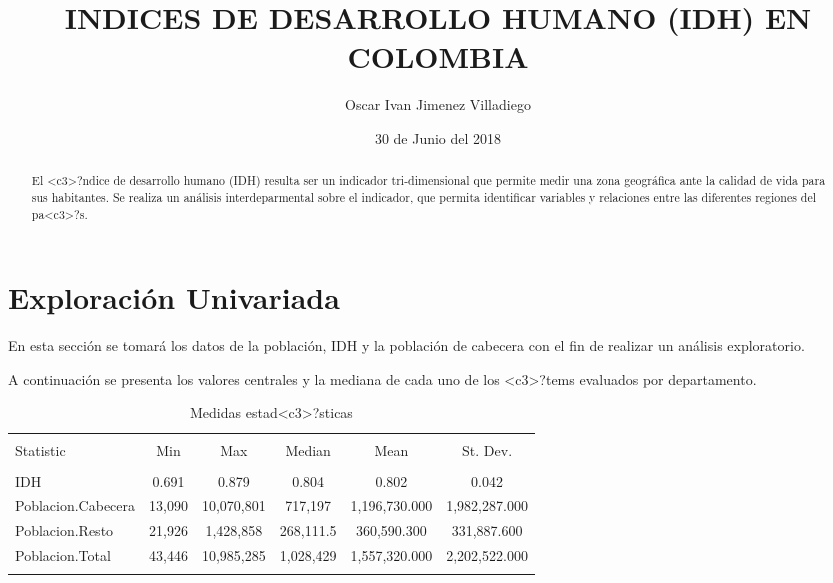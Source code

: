 \documentclass{article}
\title{INDICES DE DESARROLLO HUMANO (IDH) EN COLOMBIA}
\author[1]{\normalsize Oscar Ivan Jimenez Villadiego}
\date{30 de Junio del 2018}
\begin{document}


\maketitle

\begin{abstract}
El <c3>?ndice de desarrollo humano (IDH) resulta ser un indicador tri-dimensional que permite medir una zona geográfica ante la calidad de vida para sus habitantes. Se realiza un análisis interdeparmental sobre el indicador, que permita identificar variables y relaciones entre las diferentes regiones del pa<c3>?s.
\end{abstract}

\section{Exploración Univariada}\label{univariada}

En esta sección se tomará los datos de la población, IDH y la población de cabecera con el fin de realizar un análisis exploratorio.


A continuación se presenta los valores centrales y la mediana de cada uno de los <c3>?tems evaluados por departamento.

\begin{table}[!htbp] \centering 
  \caption{Medidas estad<c3>?sticas} 
  \label{stats} 
\begin{tabular}{@{\extracolsep{5pt}}lccccc} 
\\[-1.8ex]\hline 
\hline \\[-1.8ex] 
Statistic & \multicolumn{1}{c}{Min} & \multicolumn{1}{c}{Max} & \multicolumn{1}{c}{Median} & \multicolumn{1}{c}{Mean} & \multicolumn{1}{c}{St. Dev.} \\ 
\hline \\[-1.8ex] 
IDH & 0.691 & 0.879 & 0.804 & 0.802 & 0.042 \\ 
Poblacion.Cabecera & 13,090 & 10,070,801 & 717,197 & 1,196,730.000 & 1,982,287.000 \\ 
Poblacion.Resto & 21,926 & 1,428,858 & 268,111.5 & 360,590.300 & 331,887.600 \\ 
Poblacion.Total & 43,446 & 10,985,285 & 1,028,429 & 1,557,320.000 & 2,202,522.000 \\ 
\hline \\[-1.8ex] 
\end{tabular} 
\end{table} 
\end{document}
